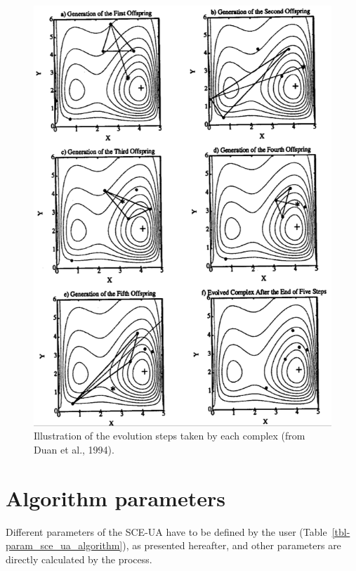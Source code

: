 \documentclass[
  letterpaper,
  DIV=11,
  numbers=noendperiod]{scrreprt}
\begin{document}
\begin{figure}

{\centering \includegraphics{./figures/fig-sce_ua_steps.png}

}

\caption{\label{fig-sce_ua_steps}Illustration of the evolution steps
taken by each complex (from Duan et al., 1994).}

\end{figure}

\hypertarget{algorithm-parameters}{%
\section{Algorithm parameters}\label{algorithm-parameters}}

Different parameters of the SCE-UA have to be defined by the user
(Table~\ref{tbl-param_sce_ua_algorithm}), as presented hereafter, and
other parameters are directly calculated by the process.
\end{document}
